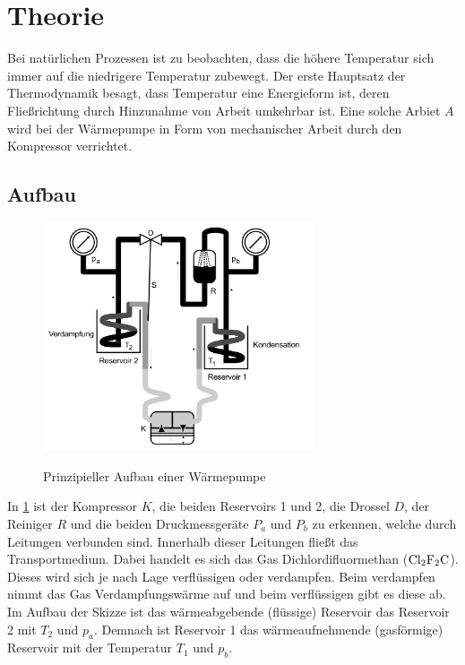 \section{Theorie}
\label{sec:Theorie}


Bei natürlichen Prozessen ist zu beobachten, dass die höhere Temperatur sich immer auf die niedrigere Temperatur zubewegt.
Der erste Hauptsatz der Thermodynamik besagt, dass Temperatur eine Energieform ist, deren Fließrichtung durch Hinzunahme von Arbeit umkehrbar ist. 
Eine solche Arbiet $A$ wird bei der Wärmepumpe in Form von mechanischer Arbeit durch den Kompressor verrichtet.

\subsection{Aufbau}

\begin{figure} 
    \centering
    \includegraphics[width=8cm] {pictures/Aufbau.png} \cite{v206} 
    \caption{Prinzipieller Aufbau einer Wärmepumpe}
    \label{fig:aufbau_wärmepumpe}
\end{figure} 


In \ref{fig:aufbau_wärmepumpe} ist der Kompressor $K$, die beiden Reservoirs 1 und 2, die Drossel $D$, der Reiniger $R$ und die beiden 
Druckmessgeräte $P_{a}$ und $P_{b}$ zu erkennen, welche durch Leitungen verbunden sind. Innerhalb dieser Leitungen fließt das 
Transportmedium. Dabei handelt es sich das Gas Dichlordifluormethan ($\ce{Cl2F2C}$). Dieses wird sich je nach Lage verflüssigen oder verdampfen. 
Beim verdampfen nimmt das Gas Verdampfungswärme auf und beim verflüssigen gibt es diese ab. \\

Im Aufbau der Skizze ist das wärmeabgebende (flüssige) Reservoir das Reservoir 2 mit $T_{2}$ und $p_{a}$. Demnach ist Reservoir 1 das wärmeaufnehmende
(gasförmige) Reservoir mit der Temperatur $T_{1}$ und $p_{b}$. \\

